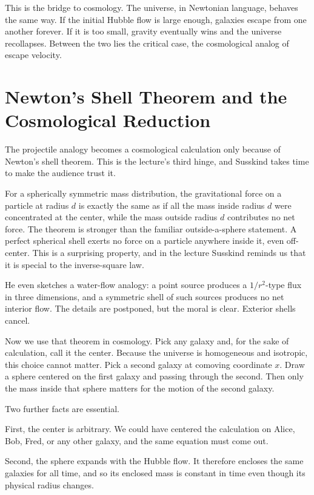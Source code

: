 This is the bridge to cosmology. The universe, in Newtonian language, behaves the same way. If the initial Hubble flow is large enough, galaxies escape from one another forever. If it is too small, gravity eventually wins and the universe recollapses. Between the two lies the critical case, the cosmological analog of escape velocity.

\section{Newton's Shell Theorem and the Cosmological Reduction}

The projectile analogy becomes a cosmological calculation only because of Newton's shell theorem. This is the lecture's third hinge, and Susskind takes time to make the audience trust it.

For a spherically symmetric mass distribution, the gravitational force on a particle at radius \(d\) is exactly the same as if all the mass inside radius \(d\) were concentrated at the center, while the mass outside radius \(d\) contributes no net force. The theorem is stronger than the familiar outside-a-sphere statement. A perfect spherical shell exerts no force on a particle anywhere inside it, even off-center. This is a surprising property, and in the lecture Susskind reminds us that it is special to the inverse-square law.

He even sketches a water-flow analogy: a point source produces a \(1/r^2\)-type flux in three dimensions, and a symmetric shell of such sources produces no net interior flow. The details are postponed, but the moral is clear. Exterior shells cancel.

Now we use that theorem in cosmology. Pick any galaxy and, for the sake of calculation, call it the center. Because the universe is homogeneous and isotropic, this choice cannot matter. Pick a second galaxy at comoving coordinate \(x\). Draw a sphere centered on the first galaxy and passing through the second. Then only the mass inside that sphere matters for the motion of the second galaxy.

Two further facts are essential.

First, the center is arbitrary. We could have centered the calculation on Alice, Bob, Fred, or any other galaxy, and the same equation must come out.

Second, the sphere expands with the Hubble flow. It therefore encloses the same galaxies for all time, and so its enclosed mass is constant in time even though its physical radius changes.

